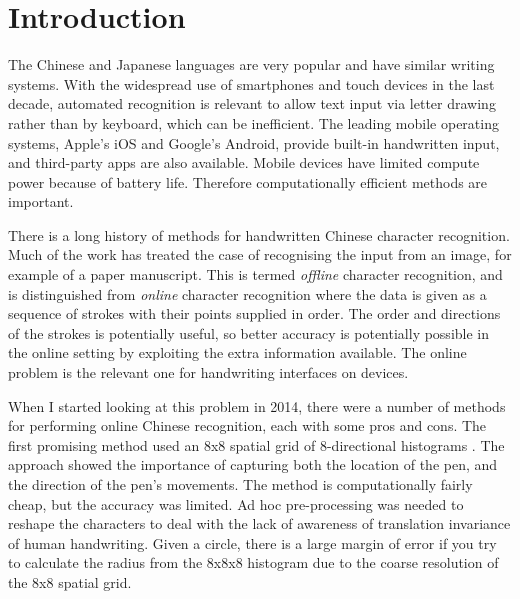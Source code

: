 

\section{Introduction}
\def\parameterSize{\scriptsize}
\label{sec:dlintro}
The Chinese and Japanese  languages are very popular and have similar writing systems.
With the widespread use of smartphones and touch devices in the last decade, automated recognition is relevant to allow text input via letter drawing rather than by keyboard, which can be inefficient.
The leading mobile operating systems, Apple's iOS and Google's Android, provide built-in handwritten input, and third-party apps are also available.
Mobile devices have limited compute power because of battery life. Therefore computationally efficient methods are important.

There is a long history of methods for handwritten Chinese character recognition. 
Much of the work has treated the case of recognising the input from an image, for example of a paper manuscript.
This is termed \emph{offline} character recognition, and is distinguished from \emph{online} character recognition where the data is given as a sequence of strokes with their points supplied in order. The order and directions of the strokes is potentially useful, so better accuracy is potentially possible in the online setting by exploiting the extra information available. The online problem is the relevant one for handwriting interfaces on devices.

When I started looking at this problem in 2014, there were a number of methods for performing online Chinese recognition, each with some pros and cons.
The first promising method used an 8x8 spatial grid of 8-directional histograms \cite{histograms}. The approach showed the importance of capturing both the location of the pen, and the direction of the pen's movements. The method is computationally fairly cheap, but the accuracy was limited. Ad hoc pre-processing was needed to reshape the characters to deal with the lack of awareness of translation invariance of human handwriting. 
Given a circle, there is a large margin of error if you try to calculate the radius from the 8x8x8 histogram due to the coarse resolution of the 8x8 spatial grid.

